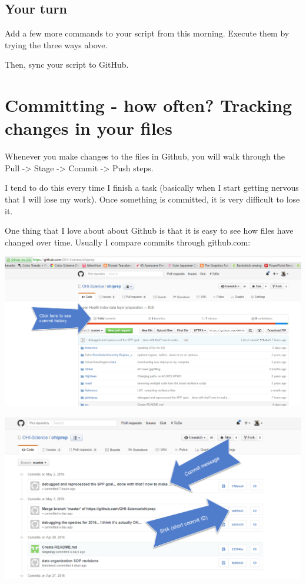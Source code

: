 \documentclass[]{book}
\theoremstyle{definition}
\theoremstyle{definition}
\theoremstyle{definition}
\theoremstyle{remark}
\begin{document}
\subsection{Your turn}\label{your-turn-3}

Add a few more commands to your script from this morning. Execute them
by trying the three ways above.

Then, sync your script to GitHub.

\section{Committing - how often? Tracking changes in your
files}\label{committing---how-often-tracking-changes-in-your-files}

Whenever you make changes to the files in Github, you will walk through
the Pull -\textgreater{} Stage -\textgreater{} Commit -\textgreater{}
Push steps.

I tend to do this every time I finish a task (basically when I start
getting nervous that I will lose my work). Once something is committed,
it is very difficult to lose it.

One thing that I love about about Github is that it is easy to see how
files have changed over time. Usually I compare commits through
github.com:

\includegraphics{img/commit_history.png}

\includegraphics{img/commit_compare_2.png}
\end{document}
